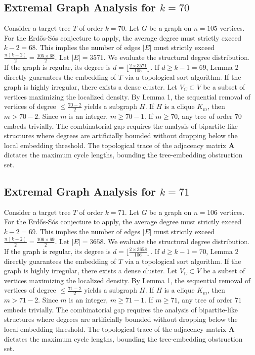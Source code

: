 \documentclass[11pt,a4paper]{article}
\begin{document}
\subsection{Extremal Graph Analysis for $k=70$}
Consider a target tree $T$ of order $k=70$.
Let $G$ be a graph on $n=105$ vertices.
For the Erd\H{o}s-S\'os conjecture to apply, the average degree must strictly exceed $k-2 = 68$.
This implies the number of edges $|E|$ must strictly exceed $\frac{n(k-2)}{2} = \frac{105 \times 68}{2}$.
Let $|E| = 3571$.
We evaluate the structural degree distribution. If the graph is regular, its degree is $d = \lfloor \frac{2 \times 3571}{105} \rfloor$.
If $d \geq k-1 = 69$, Lemma 2 directly guarantees the embedding of $T$ via a topological sort algorithm.
If the graph is highly irregular, there exists a dense cluster. Let $V_C \subset V$ be a subset of vertices maximizing the localized density.
By Lemma 1, the sequential removal of vertices of degree $\leq \frac{70-2}{2}$ yields a subgraph $H$.
If $H$ is a clique $K_{m}$, then $m > 70-2$. Since $m$ is an integer, $m \geq 70-1$. If $m \geq 70$, any tree of order $70$ embeds trivially.
The combinatorial gap requires the analysis of bipartite-like structures where degrees are artificially bounded without dropping below the local embedding threshold. The topological trace of the adjacency matrix $\mathbf{A}$ dictates the maximum cycle lengths, bounding the tree-embedding obstruction set.


\subsection{Extremal Graph Analysis for $k=71$}
Consider a target tree $T$ of order $k=71$.
Let $G$ be a graph on $n=106$ vertices.
For the Erd\H{o}s-S\'os conjecture to apply, the average degree must strictly exceed $k-2 = 69$.
This implies the number of edges $|E|$ must strictly exceed $\frac{n(k-2)}{2} = \frac{106 \times 69}{2}$.
Let $|E| = 3658$.
We evaluate the structural degree distribution. If the graph is regular, its degree is $d = \lfloor \frac{2 \times 3658}{106} \rfloor$.
If $d \geq k-1 = 70$, Lemma 2 directly guarantees the embedding of $T$ via a topological sort algorithm.
If the graph is highly irregular, there exists a dense cluster. Let $V_C \subset V$ be a subset of vertices maximizing the localized density.
By Lemma 1, the sequential removal of vertices of degree $\leq \frac{71-2}{2}$ yields a subgraph $H$.
If $H$ is a clique $K_{m}$, then $m > 71-2$. Since $m$ is an integer, $m \geq 71-1$. If $m \geq 71$, any tree of order $71$ embeds trivially.
The combinatorial gap requires the analysis of bipartite-like structures where degrees are artificially bounded without dropping below the local embedding threshold. The topological trace of the adjacency matrix $\mathbf{A}$ dictates the maximum cycle lengths, bounding the tree-embedding obstruction set.
\end{document}

